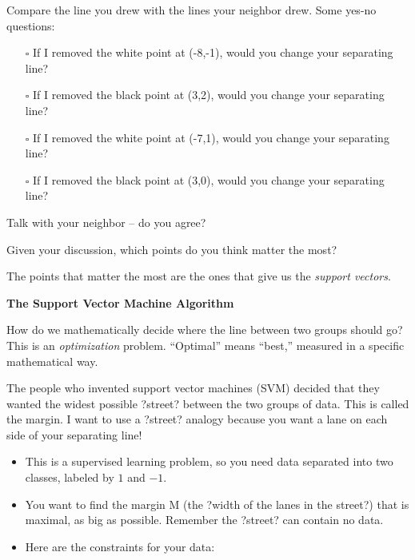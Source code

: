 \documentclass[10pt]{article}
\renewcommand{\vec}[1]{\mathbf{#1}}
\begin{document}
Compare the line you drew with the lines your neighbor drew. Some yes-no questions:
\begin{itemize}
\item[$\square$] If I removed the white point at (-8,-1), would you change your separating line?
\item[$\square$] If I removed the black point at (3,2), would you change your separating line?
\item[$\square$] If I removed the white point at (-7,1), would you change your separating line?
\item[$\square$] If I removed the black point at (3,0), would you change your separating line?
\end{itemize}
Talk with your neighbor -- do you agree?
\vspace{1in}
	
Given your discussion, which points do you think matter the most?

\vspace{1in}
The points that matter the most are the ones that give us the \textit{support vectors}.


\begin{center}
\bf{The Support Vector Machine Algorithm}
\end{center}


How do we mathematically decide where the line between two groups should go? This is an \textit{optimization} problem. ``Optimal'' means ``best,'' measured in a specific mathematical way.

The people who invented support vector machines (SVM) decided that they wanted the widest possible ?street? between the two groups of data. This is called the margin. I want to use a ?street? analogy because you want a lane on each side of your separating line!

\begin{itemize}
\item This is a supervised learning problem, so you need data separated into two classes, labeled by $1$ and $-1$.
\item  You want to find the margin M (the ?width of the lanes in the street?) that is maximal, as big as possible. Remember the ?street? can contain no data. 
\item Here are the constraints for your data: 
\end{itemize}
\end{document}
